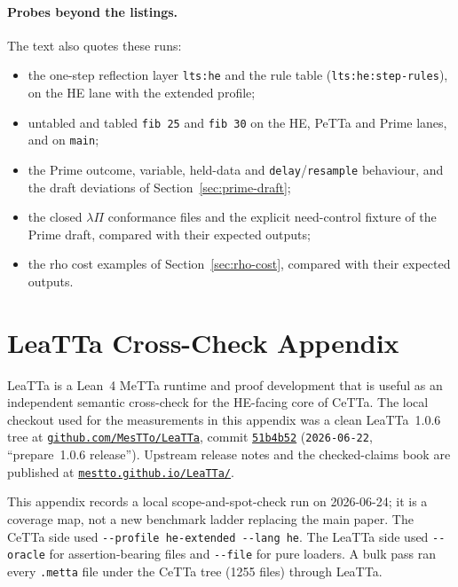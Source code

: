 \documentclass[11pt]{article}
\newcommand{\code}[1]{\texttt{#1}}
\newcommand{\PeTTa}{\textup{PeTTa}}
\newcommand{\HE}{\textup{HE}}
\newcommand{\CeTTa}{\textup{CeTTa}}
\newcommand{\LeaTTa}{\textup{LeaTTa}}
\begin{document}
\paragraph{Probes beyond the listings.}  The text also quotes these runs:
\begin{itemize}
\item the one-step reflection layer \code{lts:he} and the rule table
  (\code{lts:he:step-rules}), on the \HE{} lane with the extended profile;
\item untabled and tabled \code{fib 25} and \code{fib 30} on the \HE{},
  \PeTTa{} and Prime lanes, and on \code{main};
\item the Prime outcome, variable, held-data and \code{delay}/\code{resample}
  behaviour, and the draft deviations of Section~\ref{sec:prime-draft};
\item the closed $\lambda\Pi$ conformance files and the explicit
  need-control fixture of the Prime draft, compared with their expected
  outputs;
\item the rho cost examples of Section~\ref{sec:rho-cost}, compared with their
  expected outputs.
\end{itemize}

\section{\LeaTTa{} Cross-Check Appendix}
\label{app:leatta}

\LeaTTa{} is a Lean~4 MeTTa runtime and proof development that is useful
as an independent semantic cross-check for the \HE{}-facing core of
\CeTTa{}.  The local checkout used for the measurements in this
appendix was a clean \LeaTTa{}~1.0.6 tree at
\href{https://github.com/MesTTo/LeaTTa}{\code{github.com/MesTTo/LeaTTa}},
commit
\href{https://github.com/MesTTo/LeaTTa/tree/51b4b52bd02745992448835f5173989baf1436b5}{\code{51b4b52}}
(\code{2026-06-22}, ``prepare~1.0.6 release'').  Upstream release
notes and the checked-claims book are published at
\href{https://mestto.github.io/LeaTTa/}{\code{mestto.github.io/LeaTTa/}}.

This appendix records a local scope-and-spot-check run on 2026-06-24; it
is a coverage map, not a new benchmark ladder replacing the main paper.
The \CeTTa{} side used \code{-{}-profile he-extended -{}-lang he}.  The
\LeaTTa{} side used \code{-{}-oracle} for assertion-bearing files and
\code{-{}-file} for pure loaders.  A bulk pass ran every \code{.metta}
file under the \CeTTa{} tree (1255 files) through \LeaTTa{}.
\end{document}
